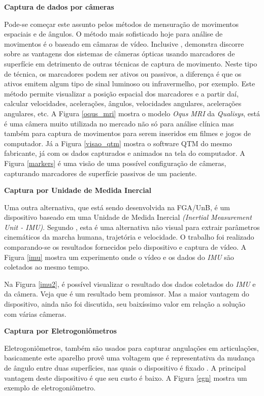 \textbf{Captura de dados por câmeras}

Pode-se começar este assunto pelos métodos de mensuração de movimentos espaciais e de ângulos.
O método mais sofisticado hoje para análise de movimentos é o baseado em câmaras de vídeo. 
Inclusive , demonstra discorre sobre as vantagens dos sistemas de câmeras ópticas usando marcadores de superfície em detrimento de outras técnicas de captura de movimento. 
Neste tipo de técnica, os marcadores podem ser ativos ou passivos, a diferença é que os ativos emitem algum tipo de sinal luminoso ou infravermelho, por exemplo. 
Este método permite visualizar a posição espacial dos marcadores e a partir daí, calcular velocidades, acelerações, ângulos, velocidades angulares, acelerações angulares, etc.
A Figura \ref{oqus_mri} mostra o modelo \emph{Oqus MRI} da \emph{Qualisys}, está é uma câmera muito utilizada no mercado não só para análise clínica mas também para captura de movimentos para serem inseridos em filmes e jogos de computador. 
Já a Figura \ref{visao_qtm} mostra o software QTM do mesmo fabricante, já com os dados capturados e animados na tela do computador.
A Figura \ref{markers} é uma visão de uma possível configuração de câmeras, capturando marcadores de superfície passivos de um paciente.

\textbf{Captura por Unidade de Medida Inercial}

Uma outra alternativa, que está sendo desenvolvida na FGA/UnB, é um dispositivo baseado em uma Unidade de Medida Inercial \emph{(Inertial Measurement Unit - IMU)}. 
Segundo , esta é uma alternativa não visual para extrair parâmetros cinemáticos da marcha humana, trajetória e velocidade. 
O trabalho foi realizado comparando-se os resultados fornecidos pelo dispositivo e captura de vídeo.
A Figura \ref{imu} mostra um experimento onde o vídeo e os dados do \emph{IMU} são coletados ao mesmo tempo.


Na Figura \ref{imu2}, é possível visualizar o resultado dos dados coletados do \emph{IMU} e da câmera. 
Veja que é um resultado bem promissor. 
Mas a maior vantagem do dispositivo, ainda não foi discutida, seu baixíssimo valor em relação a solução com várias câmeras.

\textbf{Captura por Eletrogoniômetros}

Eletrogoniômetros, também são usados para capturar angulações em articulações, basicamente este aparelho provê uma voltagem que é representativa da mudança de ângulo entre duas superfícies, nas quais o dispositivo é fixado \cite{K.Ibrahim2012}. 
A principal vantagem deste dispositivo é que seu custo é baixo. A Figura \ref{egn} mostra um exemplo de eletrogoniômetro.

